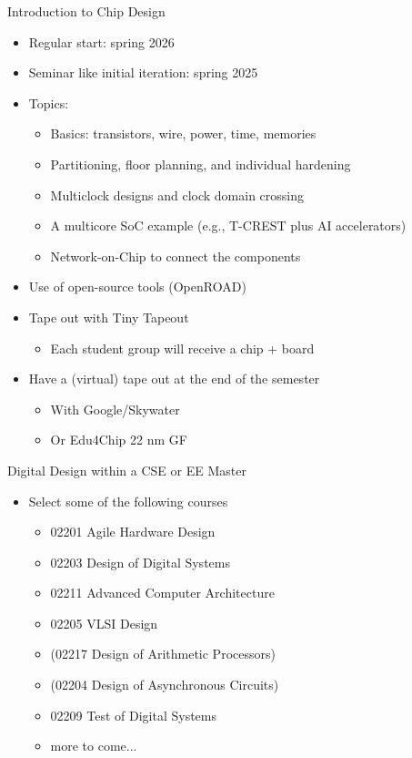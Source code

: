 \begin{frame}[fragile]{Introduction to Chip Design}
\begin{itemize}
\item Regular start: spring 2026
\item Seminar like initial iteration: spring 2025
\item Topics:
\begin{itemize}
\item Basics: transistors, wire, power, time, memories
\item Partitioning, floor planning, and individual hardening
\item Multiclock designs and clock domain crossing
\item A multicore SoC example (e.g., T-CREST plus AI accelerators)
\item Network-on-Chip to connect the components
\end{itemize}
\item Use of open-source tools (OpenROAD)
\item Tape out with Tiny Tapeout
\begin{itemize}
\item Each student group will receive a chip + board
\end{itemize}
\item Have a (virtual) tape out at the end of the semester
\begin{itemize}
\item With Google/Skywater
\item Or Edu4Chip 22 nm GF
\end{itemize}
\end{itemize}
\end{frame}

\begin{frame}[fragile]{Digital Design within a CSE or EE Master}
\begin{itemize}
\item Select some of the following courses
\begin{itemize}
\item 02201 Agile Hardware Design 
\item 02203 Design of Digital Systems
\item 02211 Advanced Computer Architecture
\item 02205 VLSI Design
\item (02217 Design of Arithmetic Processors)
\item (02204 Design of Asynchronous Circuits)
\item 02209 Test of Digital Systems
\item more to come...
\end{itemize}
\end{itemize}
\end{frame}

